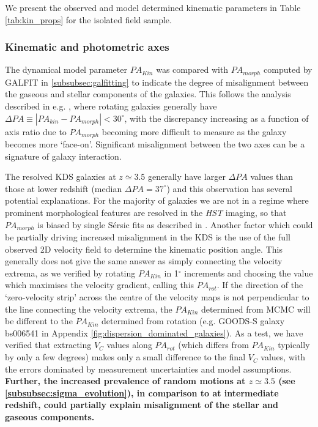 \documentclass[fleqn,usenatbib]{mnras}
\newcommand{\Sers}{S\'{e}rsic }
\begin{document}
We present the observed and model determined kinematic parameters in Table \ref{tab:kin_props} for the isolated field sample.

\subsubsection{Kinematic and photometric axes}\label{subsubsection:kin_and_phot}
The dynamical model parameter $PA_{Kin}$ was compared with $PA_{morph}$ computed by {\scriptsize GALFIT} in \cref{subsubsec:galfitting} to indicate the degree of misalignment between the gaseous and stellar components of the galaxies.
This follows the analysis described in e.g. \citealt{Epinat2008,Epinat2012,Barrera-Ballesteros2014,Barrera-Ballesteros2015,Wisnioski2015,Harrison2017,Swinbank2017}, where rotating galaxies generally have $\Delta PA \equiv |PA_{kin}-PA_{morph}| < 30^{\circ}$, with the discrepancy increasing as a function of axis ratio due to $PA_{morph}$ becoming more difficult to measure as the galaxy becomes more `face-on'.
Significant misalignment between the two axes can be a signature of galaxy interaction.

The resolved KDS galaxies at $z\simeq3.5$ generally have larger $\Delta PA$ values than those at lower redshift (median $\Delta PA = 37^{\circ}$) and this observation has several potential explanations.
For the majority of galaxies we are not in a regime where prominent morphological features are resolved in the {\em HST} imaging, so that $PA_{morph}$ is biased by single \Sers fits as described in \cite{Rodrigues2017}.
Another factor which could be partially driving increased misalignment in the KDS is the use of the full observed 2D velocity field to determine the kinematic position angle.
This generally does not give the same answer as simply connecting the velocity extrema, as we verified by rotating $PA_{Kin}$ in 1$^{\circ}$ increments and choosing the value which maximises the velocity gradient, calling this $PA_{rot}$.
If the direction of the `zero-velocity strip' across the centre of the velocity maps is not perpendicular to the line connecting the velocity extrema, the $PA_{Kin}$ determined from MCMC will be different to the $PA_{Kin}$ determined from rotation (e.g. GOODS-S galaxy bs006541 in Appendix \ref{fig:dispersion_dominated_galaxies}).
As a test, we have verified that extracting $V_{C}$ values along $PA_{rot}$ (which differs from $PA_{Kin}$ typically by only a few degrees) makes only a small difference to the final $V_{C}$ values, with the errors dominated by measurement uncertainties and model assumptions.
\textbf{Further, the increased prevalence of random motions at $z\simeq3.5$ (see \cref{subsubsec:sigma_evolution}), in comparison to at intermediate redshift, could partially explain misalignment of the stellar and gaseous components.}
\end{document}
